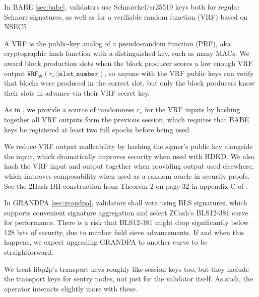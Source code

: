 \documentclass{article}
\newcommand{\sk}{\ensuremath{\mathsf{sk}}} %
\begin{document}
In BABE \ref{sec:babe}, validators use Schnorrkel/sr25519 keys both for regular Schnorr signatures, as well as for a verifiable random function (VRF) based on NSEC5 \cite{NSEC5}.  

A VRF is the public-key analog of a pseudo-random function (PRF), aka cryptographic hash function with a distinguished key, such as many MACs.  We award block production slots when the block producer scores a low enough VRF output $\mathtt{VRF}_{\sk}(r_e || \mathtt{slot\_number} )$, so anyone with the VRF public keys can verify that blocks were produced in the correct slot, but only the block producers know their slots in advance via their VRF secret key.

As in \cite{Praos}, we provide a source of randomness $r_e$ for the VRF inputs by hashing together all VRF outputs form the previous session, which requires that BABE keys be registered at least two full epochs before being used.

We reduce VRF output malleability by hashing the signer's public key alongside the input, which dramatically improves security when used with HDKD.  We also hash the VRF input and output together when providing output used elsewhere, which improves composability when used as a random oracle in security proofs.  See the 2Hash-DH construction from Theorem 2 on page 32 in appendix C of \cite{Praos}.  

In GRANDPA \ref{sec:grandpa}, validators shall vote using BLS signatures, which supports convenient signature aggregation and select ZCash's BLS12-381 curve for performance.  There is a risk that BLS12-381 might drop significantly below 128 bits of security, due to number field sieve advancements.  If and when this happens, we expect upgrading GRANDPA to another curve to be straightforward. 


We treat libp2p's transport keys roughly like session keys too, but they include the transport keys for sentry nodes, not just for the validator itself.  As such, the operator interacts slightly more with these.

\end{document}
